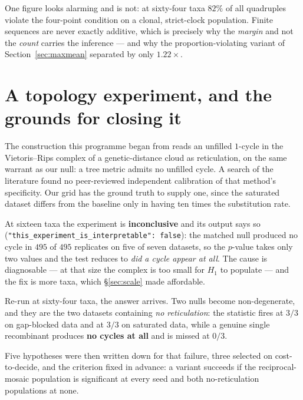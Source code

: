 \documentclass[11pt,a4paper]{article}
\theoremstyle{definition}
\theoremstyle{remark}
\begin{document}
One figure looks alarming and is not: at sixty-four taxa $82\%$ of all
quadruples violate the four-point condition on a clonal, strict-clock
population. Finite sequences are never exactly additive, which is precisely why
the \emph{margin} and not the \emph{count} carries the inference --- and why the
proportion-violating variant of Section~\ref{sec:maxmean} separated by only
$1.22\times$.

\section{A topology experiment, and the grounds for closing it}
\label{sec:topology}

The construction this programme began from reads an unfilled $1$-cycle in the
Vietoris--Rips complex of a genetic-distance cloud as reticulation, on the same
warrant as our null: a tree metric admits no unfilled cycle. A search of the
literature found no peer-reviewed independent calibration of that method's
specificity. Our grid has the ground truth to supply one, since the saturated
dataset differs from the baseline only in having ten times the substitution rate.

At sixteen taxa the experiment is \textbf{inconclusive} and its output says so
(\texttt{"this\_experiment\_is\_interpretable": false}): the matched null produced
no cycle in $495$ of $495$ replicates on five of seven datasets, so the $p$-value
takes only two values and the test reduces to \emph{did a cycle appear at all}.
The cause is diagnosable --- at that size the complex is too small for $H_1$ to
populate --- and the fix is more taxa, which \S\ref{sec:scale} made affordable.

Re-run at sixty-four taxa, the answer arrives. Two nulls become
non-degenerate, and they are the two datasets containing \emph{no reticulation}:
the statistic fires at $3/3$ on gap-blocked data and at $3/3$ on saturated data,
while a genuine single recombinant produces \textbf{no cycles at all} and is
missed at $0/3$.

Five hypotheses were then written down for that failure, three selected on
cost-to-decide, and the criterion fixed in advance: a variant succeeds if the
reciprocal-mosaic population is significant at every seed and both
no-reticulation populations at none.
\end{document}
